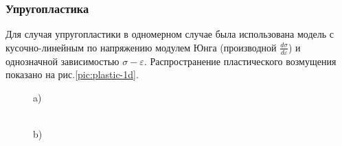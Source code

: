 \subsubsection{Упругопластика}
Для случая упругопластики в одномерном случае была использована модель с кусочно-линейным по напряжению модулем Юнга (производной $\frac{d\sigma}{d\varepsilon}$) и однозначной зависимостью $\sigma-\varepsilon$. Распространение пластического возмущения показано на рис.\ref{pic:plastic-1d}.

\begin{figure}
\begin{minipage}[h]{0.47\linewidth}
 a) \\
\end{minipage}
\hfill
\begin{minipage}[h]{0.47\linewidth}
 \\b)

\end{minipage}
\end{figure}
